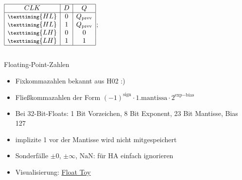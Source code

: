 \documentclass[
  german,            %
  aspectratio=169,    %
]{tumbeamer}
\begin{document}
\begin{frame}[c]
\begin{columns}[c]
\begin{column}{0.5\textwidth}
\begin{center}
\begin{circuitikz}
{						$\displaystyle
							\begin{array}{|c|c|c|}
								\hline
								CLK                            & D & Q                 \\
								\hline
								\footnotesize{\texttiming{HL}} & 0 & Q_{\textrm{prev}} \\
								\footnotesize{\texttiming{HL}} & 1 & Q_{\textrm{prev}} \\
								\footnotesize{\texttiming{LH}} & 0 & 0                 \\
								\footnotesize{\texttiming{LH}} & 1 & 1                 \\
								\hline
							\end{array}
						$};
				\end{circuitikz}
			\end{center}
		\end{column}
	\end{columns}
\end{frame}

\begin{frame}[c]{Floating-Point-Zahlen}
	\begin{itemize}
		\item Fixkommazahlen bekannt aus H02 :)
		\item Fließkommazahlen der Form $(-1)^{\textrm{sign}}\cdot 1.\textrm{mantissa}\cdot 2^{\textrm{exp}-\textrm{bias}}$
	\end{itemize}
	\begin{center}
	\end{center}
	\begin{itemize}
		\item Bei 32-Bit-Floats: 1 Bit Vorzeichen, 8 Bit Exponent, 23 Bit Mantisse, Bias 127
		\item implizite 1 vor der Mantisse wird nicht mitgespeichert
		\item Sonderfälle $\pm0$, $\pm\infty$, $\textrm{NaN}$: für HA einfach ignorieren
		\item Visualisierung: \href{https://evanw.github.io/float-toy/}{Float Toy}
	\end{itemize}
\end{frame}
\end{document}

